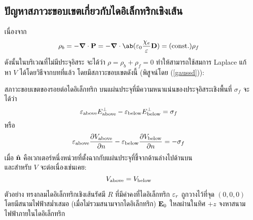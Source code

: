 \subsection{ปัญหาสภาวะขอบเขตเกี่ยวกับไดอิเล็กทริกเชิงเส้น}
เนื่องจาก
\[\rho_b=-\gd\cdot\vP=-\gd\cdot\ab(\eps_0\frac{\chi_e}{\eps}\vD)=(\cst)\rho_f\]
ดังนั้นในบริเวณที่ไม่มีประจุอิสระ จะได้ว่า $\rho=\rho_b+\rho_f=0$ ทำให้สามารถใช้สมการ Laplace แก้หา $V$ ได้โดยวิธีจากบทที่แล้ว โดยมีสภาวะขอบเขตดังนี้ (พิสูจน์โดย (\ref{gaussd})):
\begin{lawbox}{สภาวะขอบเขตของรอยต่อไดอิเล็กทริก}
    บนแผ่นประจุที่มีความหนาแน่นของประจุอิสระเชิงพื้นที่ $\sigma_f$ จะได้ว่า
\begin{equation}
    \varepsilon_{\mathrm{above}}E^\perp_{\mathrm{above}}-\varepsilon_{\mathrm{below}}E^\perp_{\mathrm{below}}=\sigma_f\label{dbound1}
\end{equation}
หรือ
\begin{equation}
    \varepsilon_{\mathrm{above}}\pdv{V_{\mathrm{above}}}{n}-\varepsilon_{\mathrm{below}}\pdv{V_{\mathrm{below}}}{n}=-\sigma_f\label{dbound2}
\end{equation}
เมื่อ $\hat{\mathbf{n}}$ คือเวกเตอร์หนึ่งหน่วยที่ตั้งฉากกับแผ่นประจุที่ชี้จากด้านล่างไปด้านบน\\
และสำหรับ $V$ จะต่อเนื่องเช่นเคย:
\begin{equation}
    V_{\mathrm{above}}=V_{\mathrm{below}}
\end{equation}
\end{lawbox}
\begin{corbox}{ตัวอย่าง}
    ทรงกลมไดอิเล็กทริกเชิงเส้นรัศมี $R$ ที่มีค่าคงที่ไดอิเล็กทริก $\varepsilon_r$ ถูกวางไว้ที่จุด $(0,0,0)$ โดยมีสนามไฟฟ้าสม่ำเสมอ (เมื่อไม่รวมสนามจากไดอิเล็กทริก) $\mathbf{E}_0$ ใหลผ่านในทิศ $+z$ จงหาสนามไฟฟ้าภายในไดอิเล็กทริก
\end{corbox}
